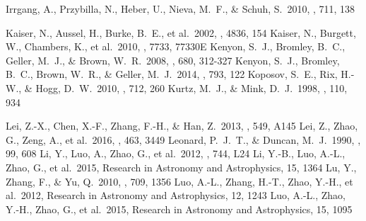 \documentclass[iop, aj]{emulateapj}
\begin{document}
\begin{thebibliography}{}
 Irrgang, A., Przybilla, N., Heber, U., Nieva, M.~F., \& Schuh, S.\ 2010, \apj, 711, 138

 Kaiser, N., Aussel, H., Burke, B.~E., et al.\ 2002, \procspie, 4836, 154
 Kaiser, N., Burgett, W., Chambers, K., et al.\ 2010, \procspie, 7733, 77330E
 Kenyon, S.~J., Bromley, B.~C., Geller, M.~J., \& Brown, W.~R.\ 2008, \apj, 680, 312-327
 Kenyon, S.~J., Bromley, B.~C., Brown, W.~R., \& Geller, M.~J.\ 2014, \apj, 793, 122
 Koposov, S.~E., Rix, H.-W., \& Hogg, D.~W.\ 2010, \apj, 712, 260
 Kurtz, M.~J., \& Mink, D.~J.\ 1998, \pasp, 110, 934

 Lei, Z.-X., Chen, X.-F., Zhang, F.-H., \& Han, Z.\ 2013, \aap, 549, A145
 Lei, Z., Zhao, G., Zeng, A., et al.\ 2016, \mnras, 463, 3449
 Leonard, P.~J.~T., \& Duncan, M.~J.\ 1990, \aj, 99, 608
 Li, Y., Luo, A., Zhao, G., et al.\ 2012, \apjl, 744, L24
 Li, Y.-B., Luo, A.-L., Zhao, G., et al.\ 2015, Research in Astronomy and Astrophysics, 15, 1364
 Lu, Y., Zhang, F., \& Yu, Q.\ 2010, \apj, 709, 1356
 Luo, A.-L., Zhang, H.-T., Zhao, Y.-H., et al.\ 2012, Research in Astronomy and Astrophysics, 12, 1243
 Luo, A.-L., Zhao, Y.-H., Zhao, G., et al.\ 2015, Research in Astronomy and Astrophysics, 15, 1095


\end{thebibliography}
\end{document}
